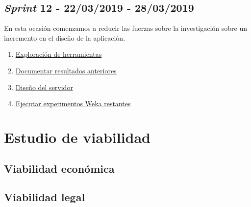 \subsection{\textit{Sprint} 12 - 22/03/2019 - 28/03/2019}
En esta ocasión comenzamos a reducir las fuerzas sobre la investigación sobre un incremento en el diseño de la aplicación.

\begin{enumerate}\addtocounter{enumi}{45}
	\item
	\href{https://github.com/joselucross/TFG-SmartBeds/issues/46}{Exploración de herramientas}
	\item
	\href{https://github.com/joselucross/TFG-SmartBeds/issues/47}{Documentar resultados anteriores}
	\item
	\href{https://github.com/joselucross/TFG-SmartBeds/issues/48}{Diseño del servidor}
	\item
	\href{https://github.com/joselucross/TFG-SmartBeds/issues/49}{Ejecutar experimentos Weka restantes}
\end{enumerate}
\section{Estudio de viabilidad}

\subsection{Viabilidad económica}

\subsection{Viabilidad legal}


